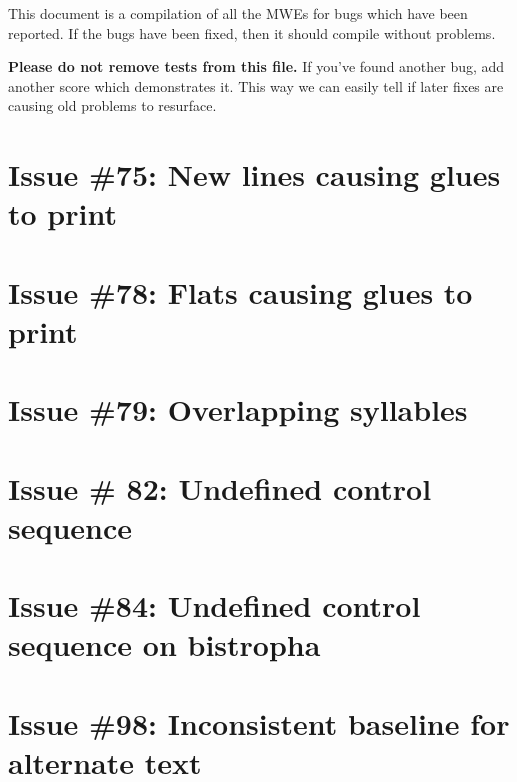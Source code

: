 \documentclass[11pt]{article}
\begin{document}
This document is a compilation of all the MWEs for bugs which have been reported.  If the bugs have been fixed, then it should compile without problems.

\textbf{Please do not remove tests from this file.}  If you've found another bug, add another score which demonstrates it.  This way we can easily tell if later fixes are causing old problems to resurface.

\section{Issue \#75: New lines causing glues to print}




\section{Issue \#78: Flats causing glues to print}

\section{Issue \#79: Overlapping syllables}

\section{Issue \# 82: Undefined control sequence}

\section{Issue \#84: Undefined control sequence on bistropha}

\section{Issue \#98: Inconsistent baseline for alternate text}
\end{document}
